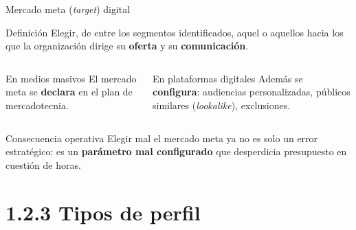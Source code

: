 \documentclass[aspectratio=169,xcolor=dvipsnames]{beamer}
\begin{document}
\begin{frame}{Mercado meta (\textit{target}) digital}
\small
\begin{block}{Definición}
  Elegir, de entre los segmentos identificados, aquel o aquellos hacia los que la organización dirige su \textbf{oferta} y su \textbf{comunicación}.
\end{block}
\begin{columns}[T]
  \begin{exampleblock}{En medios masivos}
    \small El mercado meta se \textbf{declara} en el plan de mercadotecnia.
  \end{exampleblock}
  \begin{exampleblock}{En plataformas digitales}
    \small Además se \textbf{configura}: audiencias personalizadas, públicos similares (\textit{lookalike}), exclusiones.
  \end{exampleblock}
\end{columns}
\vspace{4pt}
\begin{alertblock}{Consecuencia operativa}
  Elegir mal el mercado meta ya no es solo un error estratégico: es un \textbf{parámetro mal configurado} que desperdicia presupuesto en cuestión de horas.
\end{alertblock}
\end{frame}

\section[Perfiles]{1.2.3 Tipos de perfil}
\end{document}
